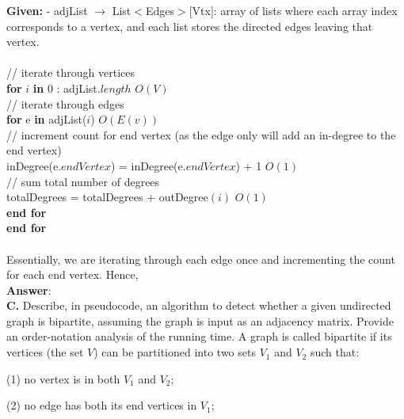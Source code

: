 \documentclass{article}
\begin{document}
	\noindent \textbf{Given:} - adjList $\rightarrow$ List$<$Edges$>$[Vtx]: array of lists where each array index corresponds to a vertex, and each list stores the directed edges leaving that vertex.\\
	\\
	// iterate through vertices \\
	\textbf{for} $i$ \textbf{in} 0 : adjList.$length$ \qquad \qquad \qquad \qquad \qquad \qquad \qquad \qquad \qquad \quad $O(V)$ \\
	\indent // iterate through edges \\
	\indent \textbf{for} e \textbf{in} adjList($i$)  \qquad \qquad \qquad \qquad \qquad \qquad \qquad \qquad \qquad \qquad \quad$O(E(v))$ \\
	\indent \indent // increment count for end vertex (as the edge only will add an in-degree to the end vertex) \\
	\indent \indent inDegree(e.$endVertex$) = inDegree(e.$endVertex$) + 1  \qquad \qquad $O(1)$ \\
	\indent \indent // sum total number of degrees \\
	\indent \indent totalDegrees = totalDegrees + outDegree$(i)$ \qquad \qquad \qquad \qquad $O(1)$ \\
	\indent \textbf{end for} \\
	\textbf{end for}\\
	\\
	Essentially, we are iterating through each edge once and incrementing the count for each end vertex. Hence,\\
	\textbf{Answer}: \\
	\textbf{C.} Describe, in pseudocode, an algorithm to detect whether a given undirected graph is bipartite, assuming the graph is input as an adjacency matrix. Provide an order-notation analysis of the running time. A graph is called bipartite if its vertices (the set $V$) can be partitioned into two sets $V_1$ and $V_2$ such that: 
	
	(1) no vertex is in both $V_1$ and $V_2$; 
	
	(2) no edge has both its end vertices in $V_1$; 
	
\end{document}
